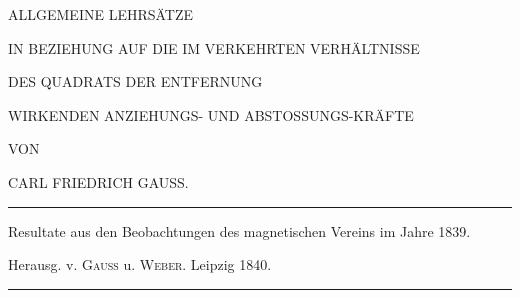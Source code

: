 \clearpage
\thispagestyle{empty}
\begin{center}
\vspace*{0.6in}
{\Large ALLGEMEINE LEHRSÄTZE\par}
\bigskip
IN BEZIEHUNG AUF DIE IM VERKEHRTEN VERHÄLTNISSE\par
\bigskip
{\Large DES QUADRATS DER ENTFERNUNG\par}
\bigskip
WIRKENDEN ANZIEHUNGS- UND ABSTOSSUNGS-KRÄFTE\par
\vspace{0.5in}
VON\par
\bigskip
{\large CARL FRIEDRICH GAUSS.\par}
\vfill
\rule{0.85\textwidth}{0.3pt}\par
Resultate aus den Beobachtungen des magnetischen Vereins im Jahre 1839.\par
Herausg. v. \textsc{Gauss} u. \textsc{Weber}. Leipzig 1840.\par
\rule{0.85\textwidth}{0.3pt}
\end{center}
